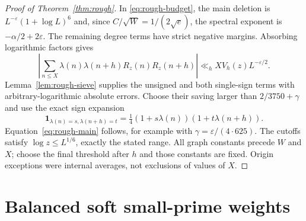 \documentclass[11pt]{article}
\theoremstyle{definition}
\newcommand{\ind}{\mathbf 1}
\theoremstyle{remark}
\numberwithin{equation}{section}
\newcommand{\eps}{\varepsilon}
\begin{document}
\begin{proof}[Proof of Theorem~\ref{thm:rough}]
In \eqref{eq:rough-budget}, the main deletion is $L^{-\eps}(1+\log L)^6$ and, since
$C/\sqrt W=1/(2\sqrt e)$, the spectral exponent is $-\alpha/2+2\eps$.
The remaining degree terms have strict negative margins. Absorbing logarithmic factors gives
\begin{equation}\label{eq:rough-joint}
 \left|\sum_{n\le X}\lambda(n)\lambda(n+h)R_z(n)R_z(n+h)\right|
 \ll_h XV_h(z)L^{-\eps/2}.
\end{equation}
Lemma~\ref{lem:rough-sieve} supplies the unsigned and both single-sign terms with arbitrary-logarithmic absolute
errors. Choose their saving larger than $2/3750+\gamma$ and use the exact sign expansion
\begin{equation}\label{eq:sign-expansion}
 \ind_{\lambda(n)=s,\lambda(n+h)=t}
 =\tfrac14(1+s\lambda(n))(1+t\lambda(n+h)).
\end{equation}
Equation~\eqref{eq:rough-main} follows, for example with $\gamma=\eps/(4\cdot625)$.
The cutoffs satisfy $\log z\le L^{1/6}$, exactly the stated range. All graph constants precede $W$ and $X$;
choose the final threshold after $h$ and those constants are fixed. Origin exceptions were internal averages,
not exclusions of values of $X$.
\end{proof}

\section{Balanced soft small-prime weights}\label{sec:soft}
\end{document}
